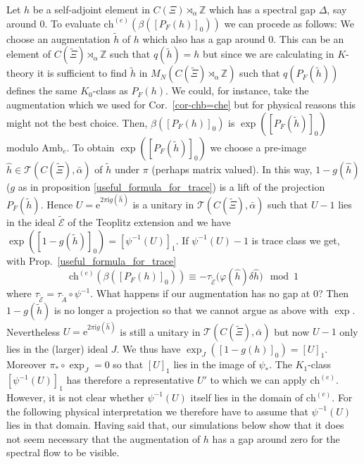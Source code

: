 \documentclass[11pt]{amsart}
\newcommand{\Z}{\mathbb{Z}}
\newcommand{\ch}{\text{ch}}
\newcommand{\che}{\text{ch}^{(e)}}
\renewcommand{\b}{\psi}
\begin{document}
Let $h$ be a self-adjoint element in $C( \Xi)\rtimes_\alpha\Z$ which has a spectral gap $\Delta$, say around $0$. 
To evaluate $\che(\beta([P_F(h)]_0))$ we can procede as follows: We choose an augmentation $\tilde h$ of $h$ which also has a gap around $0$. This can be an element of $C(\tilde\Xi )\rtimes_\alpha \Z$ such that $q(\tilde h) = h$ but since we are calculating in $K$-theory it is sufficient to find 
$\tilde h$ in $M_N(C(\tilde\Xi )\rtimes_\alpha \Z)$ such that $q(P_F(\tilde h))$ defines the same $K_0$-class as $P_F(h)$. We could, for instance, take the augmentation which we used for Cor.~\ref{cor-chb=che} but for physical reasons this might not the best choice. 
Then, $\beta([P_F(h)]_0)$ is $\exp([P_F(\tilde h)]_0)$ modulo $\mathrm{Amb}_e$. To obtain $\exp([P_F(\tilde h)]_0)$ we choose a pre-image $\hat h\in \mathcal{T}(C(\tilde\Xi), \bar{\alpha})$ of $\tilde{h}$ under $\pi$ (perhaps matrix valued). 
In this way, $1-g(\hat h)$ ($g$ as in proposition \ref{useful_formula_for_trace}) is a lift of the projection $P_F(\tilde h)$.
Hence $U=\mathrm{e}^{2\pi\mathrm{i}g(\hat h)}$ is a unitary in $\mathcal{T}(C(\tilde\Xi), \bar{\alpha}) $ such that $U-1$ lies in the ideal %
$\tilde{\mathcal E}$ of the Teoplitz extension 
and we have 
$\exp ([1-g( \tilde h)]_0)=[\psi^{-1}(U)]_1$. If $\psi^{-1}(U)-1$ is trace class we get, with Prop.~\ref{useful_formula_for_trace}
\begin{equation}\label{eq-che-mapping}
\che(\beta([P_F(h)]_0)) %
\equiv - \tau_{\tilde{\mathcal  E}}\big( \varphi(\hat h)\delta \hat h\big) \mod{1}
\end{equation}
where $\tau_{\tilde{\mathcal  E}} = \tau_{\tilde A}\circ\psi^{-1}$.
What happens if our augmentation has no gap at $0$? Then $1-g(\tilde h)$ is no longer a projection so that we cannot argue as above with $\exp$. Nevertheless $U=\mathrm{e}^{2\pi\mathrm{i}g(\hat h)}$ is still a unitary in $\mathcal{T}(C(\tilde\Xi), \bar{\alpha}) $ but now $U-1$ only lies in the (larger) ideal $J$. We thus have  $\exp_J ([1-g( h)]_0)=[U]_1$. Moreover $\pi_*\circ \exp_J=0$ so that $[U]_1$ lies in the image of $\b_*$. The $K_1$-class $[\psi^{-1}(U)]_1$ has therefore a representative $U'$ to which we can apply $\ch^{(e)}$. However, it is not clear whether $\psi^{-1}(U)$ itself lies in the domain of $\ch^{(e)}$. For the following physical interpretation we therefore have to assume that $\psi^{-1}(U)$ lies in that domain. Having said that, our simulations below show that it does not seem necessary that the augmentation of $h$ has a gap around zero for the spectral flow to be visible.
\end{document}
